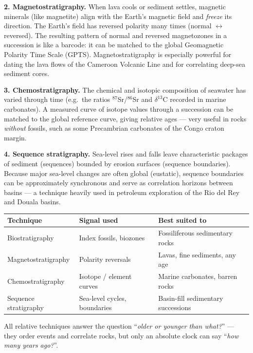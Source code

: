 \documentclass[11pt]{article}
\newcommand{\cle}[1]{{\popxbold\color{popdark}#1}}
\begin{document}
\textbf{2. Magnetostratigraphy.} When lava cools or sediment settles, magnetic minerals (like magnetite) align with the Earth's magnetic field and \emph{freeze} its direction. The Earth's field has reversed polarity many times (normal $\leftrightarrow$ reversed). The resulting pattern of normal and reversed \cle{magnetozones} in a succession is like a barcode: it can be matched to the global \cle{Geomagnetic Polarity Time Scale} (GPTS). Magnetostratigraphy is especially powerful for dating the lava flows of the \cle{Cameroon Volcanic Line} and for correlating deep-sea sediment cores.

\textbf{3. Chemostratigraphy.} The chemical and isotopic composition of seawater has varied through time (e.g.\ the ratios $^{87}$Sr/$^{86}$Sr and $\delta^{13}$C recorded in marine carbonates). A measured curve of isotope values through a succession can be matched to the global reference curve, giving relative ages --- very useful in rocks \emph{without} fossils, such as some Precambrian carbonates of the Congo craton margin.

\textbf{4. Sequence stratigraphy.} Sea-level rises and falls leave characteristic packages of sediment (\cle{sequences}) bounded by erosion surfaces (\cle{sequence boundaries}). Because major sea-level changes are often global (eustatic), sequence boundaries can be approximately synchronous and serve as correlation horizons between basins --- a technique heavily used in petroleum exploration of the Rio del Rey and Douala basins.

\begin{center}
\begin{tabularx}{\linewidth}{|l|X|X|}
\hline
\rowcolor{popblueL} \textbf{Technique} & \textbf{Signal used} & \textbf{Best suited to} \\
\hline
Biostratigraphy & Index fossils, biozones & Fossiliferous sedimentary rocks \\
\hline
Magnetostratigraphy & Polarity reversals & Lavas, fine sediments, any age \\
\hline
Chemostratigraphy & Isotope / element curves & Marine carbonates, barren rocks \\
\hline
Sequence stratigraphy & Sea-level cycles, boundaries & Basin-fill sedimentary successions \\
\hline
\end{tabularx}
\end{center}

\begin{aretenir}
All relative techniques answer the question ``\emph{older or younger than what?}'' --- they order events and correlate rocks, but only an absolute clock can say ``\emph{how many years ago?}''.
\end{aretenir}
\end{document}
